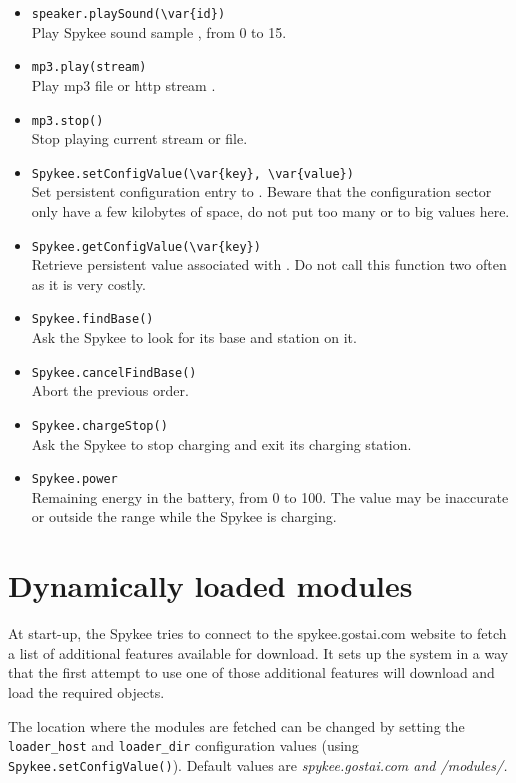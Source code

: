 \begin{itemize}
\item \lstinline|speaker.playSound(\var{id})| \\
  Play Spykee sound sample , from 0 to 15.
\item \lstinline|mp3.play(stream)| \\
  Play mp3 file or http stream .
\item \lstinline|mp3.stop()| \\
  Stop playing current stream or file.
\item \lstinline|Spykee.setConfigValue(\var{key}, \var{value})| \\
  Set persistent configuration entry  to . Beware
  that the configuration sector only have a few kilobytes of space, do
  not put too many or to big values here.
\item \lstinline|Spykee.getConfigValue(\var{key})| \\
  Retrieve persistent value associated with . Do not call
  this function two often as it is very costly.
\item \lstinline|Spykee.findBase()| \\
  Ask the Spykee to look for its base and station on it.
\item \lstinline|Spykee.cancelFindBase()| \\
  Abort the previous order.
\item \lstinline|Spykee.chargeStop()| \\
  Ask the Spykee to stop charging and exit its charging station.
\item \lstinline|Spykee.power| \\
  Remaining energy in the battery, from 0 to 100. The value may be
  inaccurate or outside the range while the Spykee is charging.
\end{itemize}

\section{Dynamically loaded modules}
At start-up, the Spykee tries to connect to the spykee.gostai.com website to
fetch a list of additional features available for download.
It sets up the system in a way that the first attempt to use one of those
additional features will download and load the required objects.

The location where the modules are fetched can be changed by setting the
\lstinline|loader_host| and \lstinline|loader_dir| configuration values (using
\lstinline|Spykee.setConfigValue()|).
Default values are \em{spykee.gostai.com} and \em{/modules/}.

